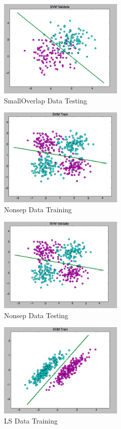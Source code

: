 \documentclass[pageno]{jpaper}
\begin{document}
\begin{figure}[ht!]
\centering
\includegraphics[width=60mm]{smallOverlap_test}
\caption{SmallOverlap Data Testing}
\label{overflow}
\end{figure}

\begin{figure}[ht!]
\centering
\includegraphics[width=60mm]{nonsep_train}
\caption{Nonsep Data Training}
\label{overflow}
\end{figure}

\begin{figure}[ht!]
\centering
\includegraphics[width=60mm]{nonsep_test}
\caption{Nonsep Data Testing}
\label{overflow}
\end{figure}

\begin{figure}[ht!]
\centering
\includegraphics[width=60mm]{ls_train}
\caption{LS Data Training}
\label{overflow}
\end{figure}
\end{document}
